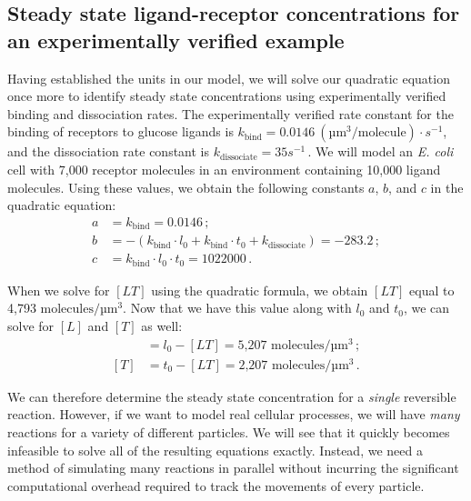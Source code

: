 \fudgespace

\begin{qbox}\end{qbox}

\FloatBarrier
{}
\subsection{Steady state ligand-receptor concentrations for an experimentally verified example}

Having established the units in our model, we will solve our quadratic equation once more to identify steady state concentrations using experimentally verified binding and dissociation rates. The experimentally verified rate constant for the binding of receptors to glucose ligands is $k_\text{bind} = 0.0146~(\text{µm}^3/\text{molecule}) \cdot s^{-1}$, and the dissociation rate constant is $k_\text{dissociate} = 35s^{-1}$\,. We will model an \textit{E. coli} cell with 7,000 receptor molecules in an environment containing 10,000 ligand molecules. Using these values, we obtain the following constants $a$, $b$, and $c$ in the quadratic equation:
\begin{align*}
a & = k_\text{bind} = 0.0146\,;\\
b & = - (k_\text{bind} \cdot l_0 + k_\text{bind} \cdot t_0 + k_\text{dissociate}) = -283.2\,;\\
c & = k_\text{bind} \cdot l_0 \cdot t_0 = 1022000\,.
\end{align*}

When we solve for $[LT]$ using the quadratic formula, we obtain $[LT]$ equal to 4,793 $\text{molecules}/\text{µm}^3$. Now that we have this value along with $l_0$ and $t_0$, we can solve for $[L]$ and $[T]$ as well:
\begin{align*}
[L] & = l_0 - [LT] = \text{5,207 molecules}/\text{µm}^3\,;\\
[T] & = t_0 - [LT] = \text{2,207 molecules}/\text{µm}^3\,.
\end{align*}

We can therefore determine the steady state concentration for a \textit{single} reversible reaction. However, if we want to model real cellular processes, we will have \textit{many} reactions for a variety of different particles. We will see that it quickly becomes infeasible to solve all of the resulting equations exactly. Instead, we need a method of simulating many reactions in parallel without incurring the significant computational overhead required to track the movements of every particle.\\

